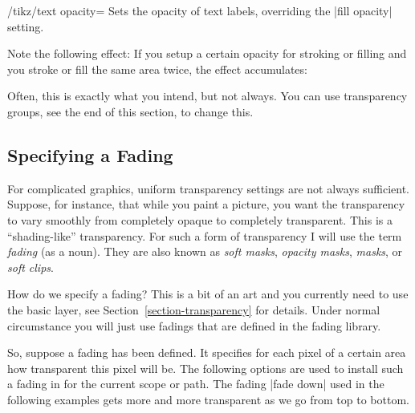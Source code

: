 \begin{key}{/tikz/text opacity=}
  Sets the opacity of text labels, overriding the |fill opacity| setting. 
\begin{codeexample}[]
\end{codeexample}
\end{key}


Note the following effect: If you setup a certain opacity for stroking
or filling and you stroke or fill the same area twice, the effect
accumulates:

\begin{codeexample}[]
\end{codeexample}

Often, this is exactly what you intend, but not always. You can use
transparency groups, see the end of this section, to change this.



\subsection{Specifying a Fading}

For complicated graphics, uniform transparency settings are not always
sufficient. Suppose, for instance, that while you paint a picture, you
want the transparency to vary smoothly from completely opaque to
completely transparent. This is a ``shading-like'' transparency. For
such a form of transparency I will use the term \emph{fading} (as a
noun). They are also known as \emph{soft masks}, \emph{opacity masks},
\emph{masks}, or \emph{soft clips}.

How do we specify a fading? This is a bit of an art and you currently
need to use the basic layer, see Section~\ref{section-transparency} for
details. Under normal circumstance you will just use fadings that are
defined in the fading library. 

So, suppose a fading has been defined. It specifies for each pixel of
a certain area how transparent this pixel will be. The following
options are used to install such a fading in for the current scope or
path. The fading |fade down| used in the following examples gets more
and more transparent as we go from top to bottom.

